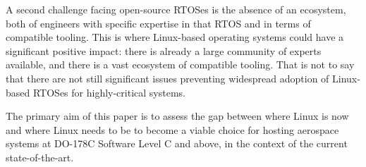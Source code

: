 A second challenge facing open-source RTOSes is the absence of an ecosystem, both of engineers with specific expertise in that RTOS and in terms of compatible tooling. This is where Linux-based operating systems could have a significant positive impact: there is already a large community of experts available, and there is a vast ecosystem of compatible tooling. That is not to say that there are not still significant issues preventing widespread adoption of Linux-based RTOSes for highly-critical systems.

The primary aim of this paper is to assess the gap between where Linux is now and where Linux needs to be to become a viable choice for hosting aerospace systems at DO-178C Software Level C and above, in the context of the current state-of-the-art. 
